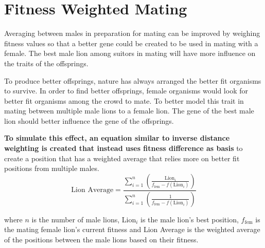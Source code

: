 \section{Fitness Weighted Mating}
\par Averaging between males in preparation for mating can be improved by weighing fitness values so that a better gene could be created to be used in mating with a female. The best male lion among suitors in mating will have more influence on the traits of the offsprings.

\par To produce better offsprings, nature has always arranged the better fit organisms to survive. In order to find better offsprings, female organisms would look for better fit organisms among the crowd to mate. To better model this trait in mating between multiple male lions to a female lion. The gene of the best male lion should better influence the gene of the offsprings.

\par \textbf{To simulate this effect, an equation similar to inverse distance weighting is created that instead uses fitness difference as basis} to create a position that has a weighted average that relies more on better fit positions from multiple males.
$$
\text{Lion Average} = \frac{\displaystyle\sum_{i=1}^{n} \left( \frac{\text{Lion}_i}{f_{\text{fem}} - f(\text{Lion}_i)} \right)}{\displaystyle\sum_{i=1}^{n} \left( \frac{1}{f_{\text{fem}} - f(\text{Lion}_i)} \right)}
$$

where $n$ is the number of male lions, Lion$_i$ is the male lion's best position, $f_{\text{fem}}$ is the mating female lion's current fitness and Lion Average is the weighted average of the positions between the male lions based on their fitness.
